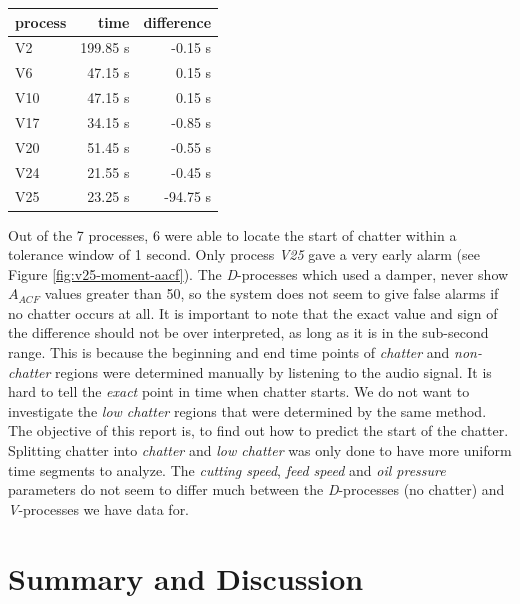\documentclass[12 pt]{scrartcl}
\begin{document}
\begin{table}[ht]
  \centering
  \label{tab:pointdiff}
  \begin{tabular}{l|rr}
    process & time     & difference \\
    \hline
    V2      & 199.85 s & -0.15 s    \\
    V6      & 47.15 s  & 0.15 s     \\
    V10     & 47.15 s  & 0.15 s     \\
    V17     & 34.15 s  & -0.85 s    \\
    V20     & 51.45 s  & -0.55 s    \\
    V24     & 21.55 s  & -0.45 s    \\
    V25     & 23.25 s  & -94.75 s   \\
  \end{tabular}
\end{table}

Out of the 7 processes, 6 were able to locate the start of chatter within a tolerance window of 1 second. Only process \emph{V25} gave a very early alarm (see Figure \ref{fig:v25-moment-aacf}). The \emph{D}-processes which used a damper, never show $A_{ACF}$ values greater than 50, so the system does not seem to give false alarms if no chatter occurs at all.
It is important to note that the exact value and sign of the difference should not be over interpreted, as long as it is in the sub-second range. This is because the beginning and end time points of \emph{chatter} and \emph{non-chatter} regions were determined manually by listening to the audio signal. It is hard to tell the \emph{exact} point in time when chatter starts. We do not want to investigate the \emph{low chatter} regions that were determined by the same method. The objective of this report is, to find out how to predict the start of the chatter. Splitting chatter into \emph{chatter} and \emph{low chatter} was only done to have more uniform time segments to analyze.
The \emph{cutting speed}, \emph{feed speed} and \emph{oil pressure} parameters do not seem to differ much between the \emph{D}-processes (no chatter) and \emph{V}-processes we have data for.

\section{Summary and Discussion}
\end{document}
